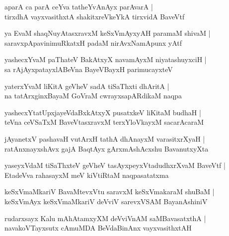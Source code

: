 \begin{shloka}
aparA ca parA ceYva tatheYvAnAyx parAvarA |\\
tirxdhA vayxvasithxtA shakitxreVkeYkA tirxvidA BaveVtf
\end{shloka}

\begin{shloka}
ya EvaM shaqNuyAtasxravxM keSxVmAyxyAH paramaM shivaM |\\
saravxpApavinimuRkatxH padaM nirAvxNamApunx yAtf 
\end{shloka}

\begin{shloka}
yashecxYvaM paThateV BakAtxyX navamAyxM niyatashuyxciH |\\
sa rAjAyxpatayxlABeVna BayeVBayxH parimucayxteV 
\end{shloka}

\begin{shloka}
yaterxYvaM liKitA geVheV sadA tiSaThxti dhAritA |\\
na tatArxginxBayaM GoVraM cwrayxsapARdikaM naqpa
\end{shloka}

\begin{shloka}
yashecxYtatUpxjayeVdaBxkAtxyX pusatxkeV liKitaM budhaH |\\
teVna ceVSaTxM BaveVtasxravxM terxYloVkayxM sacarAcaraM 
\end{shloka}

\begin{shloka}
jAyanetxV pashavaH vutArxH tathA dhAnayxM varasitxrXyaH |\\
ratAnxnayxshAvx gajA BaqtAyx gArxmAshAcxshu BavanutxyXta 
\end{shloka}

\begin{shloka}
yaseyxVdaM tiSaThxteV geVheV tasAyxpeyxVtadudhxrXvaM BaveVtf |\\
EtadeVva rahasayxM meV kiVtiRtaM naqpasatatxma
\end{shloka}

\begin{shloka}
keSxVmaMkariV BavaMtevxVtu saravxM keSxVmakaraM shuBaM |\\
keSxVmAyx keSxVmaMkariV deVviV sarevxVSAM BayanAshiniV 
\end{shloka}

\begin{shloka}
rudarxsayx Kalu mAhAtamxyXM deVviVnAM saMBavasatxthA |\\
navakoVTayxsutx cAmuMDA BeVdaBinAnx vayxvasithxtAH 
\end{shloka}

